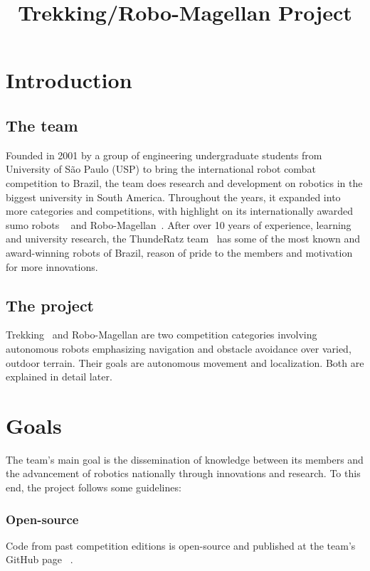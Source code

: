\documentclass[conference]{IEEEtran}
\begin{document}
\title{Trekking/Robo-Magellan Project}

\author{
}

\maketitle

\section{Introduction}
\subsection{The team}
Founded in 2001 by a group of engineering undergraduate students from University
of São Paulo (USP) to bring the international robot combat competition to Brazil,
the team does research and development on robotics in the biggest university in
South America. Throughout the years, it expanded into more categories and
competitions, with highlight on its internationally awarded sumo robots
~\cite{All Japan Robot Sumo} and Robo-Magellan~\cite{SRS}. After over 10 years
of experience, learning and university research, the ThundeRatz team~\cite{ThundeRatz}
has some of the most known and award-winning robots of Brazil, reason of pride to
the members and motivation for more innovations.

\subsection{The project}
Trekking~\cite{Trekking} and Robo-Magellan are two competition categories
involving autonomous robots emphasizing navigation and obstacle avoidance over
varied, outdoor terrain. Their goals are autonomous movement and localization.
Both are explained in detail later.

\section{Goals}
\setcounter{section}{0}
The team's main goal is the dissemination of knowledge between its members and
the advancement of robotics nationally through innovations and research. To this
end, the project follows some guidelines:
\subsubsection{Open-source}
Code from past competition editions is open-source and published at the team's
GitHub page ~\cite{Git-TR}.
\end{document}
